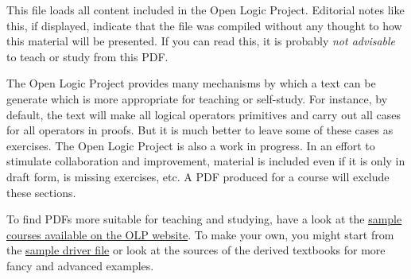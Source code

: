 \documentclass[../include/open-logic-part]{subfiles}
\begin{document}
\clearpage

\begin{editorial}
This file loads all content included in the Open Logic Project.
Editorial notes like this, if displayed, indicate that the file was
compiled without any thought to how this material will be presented.
If you can read this, it is probably \emph{not advisable} to teach or
study from this PDF. 

The Open Logic Project provides many mechanisms by which a text can be
generate which is more appropriate for teaching or self-study.  For
instance, by default, the text will make all logical operators
primitives and carry out all cases for all operators in proofs.  But
it is much better to leave some of these cases as exercises. The Open
Logic Project is also a work in progress. In an effort to stimulate
collaboration and improvement, material is included even if it is
only in draft form, is missing exercises, etc.  A PDF produced for a
course will exclude these sections.

To find PDFs more suitable for teaching and studying, have a look at
the \href{http://builds.openlogicproject.org/}{sample courses
  available on the OLP website}. To make your own, you might start
from the
\href{https://github.com/OpenLogicProject/OpenLogic/tree/master/courses/sample}{sample
  driver file} or look at the sources of the derived textbooks for
more fancy and advanced examples.
\end{editorial}


















\end{document}
